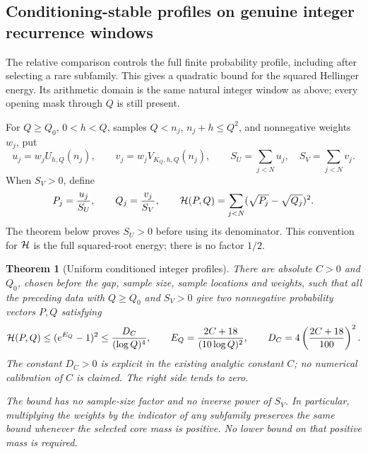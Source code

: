 \documentclass[11pt]{article}
\newtheorem{theorem}{Theorem}[section]
\begin{document}
\subsection{Conditioning-stable profiles on genuine integer recurrence windows}
The relative comparison controls the full finite probability profile,
including after selecting a rare subfamily. This gives a quadratic
bound for the squared Hellinger energy. Its arithmetic domain is the
same natural integer window as above; every opening mask through
\(Q\) is still present.

For \(Q\geq Q_0\), \(0<h<Q\), samples \(Q<n_j\),
\(n_j+h\leq Q^2\), and nonnegative weights \(w_j\), put
\[
 u_j=w_jU_{h,Q}(n_j),\qquad
 v_j=w_jV_{K_Q,h,Q}(n_j),\qquad
 S_U=\sum_{j<N}u_j,\quad S_V=\sum_{j<N}v_j.
\]
When \(S_V>0\), define
\[
 P_j=\frac{u_j}{S_U},\qquad Q_j=\frac{v_j}{S_V},\qquad
 {\cal H}(P,Q)=\sum_{j<N}(\sqrt{P_j}-\sqrt{Q_j})^2.
\]
The theorem below proves \(S_U>0\) before using its denominator.
This convention for \({\cal H}\) is the full squared-root energy;
there is no factor \(1/2\).

\begin{theorem}[Uniform conditioned integer profiles]
\label{thm:conditioned-integer-profiles}
There are absolute \(C>0\) and \(Q_0\), chosen before the gap,
sample size, sample locations and weights, such that all the preceding
data with \(Q\geq Q_0\) and \(S_V>0\) give two nonnegative
probability vectors \(P,Q\) satisfying
\[
 {\cal H}(P,Q)
 \leq (e^{E_Q}-1)^2
 \leq \frac{D_C}{(\log Q)^4},
 \qquad
 E_Q=\frac{2C+18}{(10\log Q)^2},
 \qquad
 D_C=4\left(\frac{2C+18}{100}\right)^2.
\]
The constant \(D_C>0\) is explicit in the existing analytic constant
\(C\); no numerical calibration of \(C\) is claimed.
The right side tends to zero.

The bound has no sample-size factor and no inverse power of \(S_V\).
In particular, multiplying the weights by the indicator of any
subfamily preserves the same bound whenever the selected core mass
is positive. No lower bound on that positive mass is required.
\end{theorem}
\end{document}
